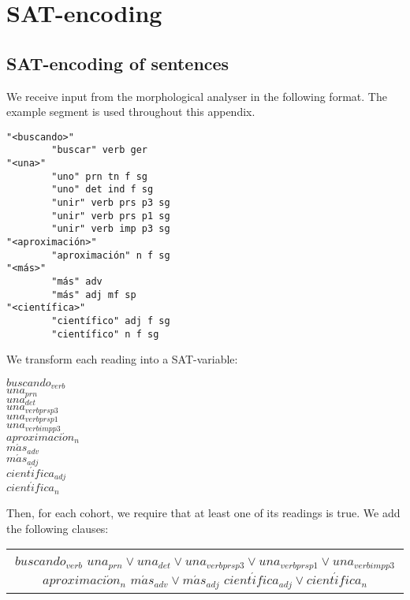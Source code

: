 \appendix
\chapter{SAT-encoding}

\section{SAT-encoding of sentences}

We receive input from the morphological analyser in the following format.
The example segment is used throughout this appendix.

\begin{verbatim}
"<buscando>"
        "buscar" verb ger
"<una>"
        "uno" prn tn f sg
        "uno" det ind f sg
        "unir" verb prs p3 sg
        "unir" verb prs p1 sg
        "unir" verb imp p3 sg
"<aproximación>"
        "aproximación" n f sg
"<más>"
        "más" adv
        "más" adj mf sp
"<científica>"
        "científico" adj f sg
        "científico" n f sg
\end{verbatim}

We transform each reading into a SAT-variable:

\begin{centering}
$buscando_{verb}$ \\
$una_{prn}$ \\
$una_{det}$ \\
$una_{verb prs p3}$ \\
$una_{verb prs p1}$ \\
$una_{verb imp p3}$ \\
$aproximaci\acute{o}n_n$ \\
$m\acute{a}s_{adv}$ \\
$m\acute{a}s_{adj}$ \\
$cient\acute{i}fica_{adj}$ \\
$cient\acute{i}fica_n$ \\
\end{centering}

Then, for each cohort, we require that at least one of its readings is true. We add the following clauses:

\begin{centering}
\begin{tabular}{c}
$buscando_{verb}$
$una_{prn} \vee una_{det} \vee una_{verb prs p3} \vee una_{verb prs p1} \vee una_{verb imp p3}$
$aproximaci\acute{o}n_n$
$m\acute{a}s_{adv} \vee m\acute{a}s_{adj}$
$cient\acute{i}fica_{adj}\vee cient\acute{i}fica_n$
\end{tabular}
\end{centering}

